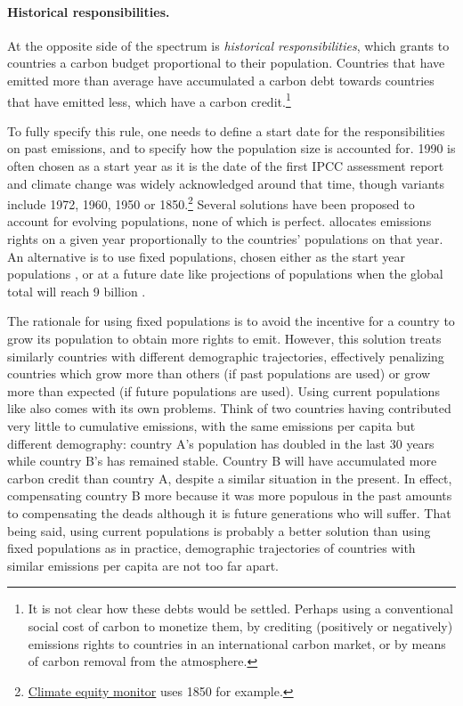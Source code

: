 \paragraph{Historical responsibilities.} At the opposite side of the spectrum is \textit{historical responsibilities}, which grants to countries a carbon budget proportional to their population. Countries that have emitted more than average have accumulated a carbon debt towards countries that have emitted less, which have a carbon credit.\footnote{It is not clear how these debts would be settled. Perhaps using a conventional social cost of carbon to monetize them, by crediting (positively or negatively) emissions rights to countries in an international carbon market, or by means of carbon removal from the atmosphere.} 

To fully specify this rule, one needs to define a start date for the responsibilities on past emissions, and to specify how the population size is accounted for. 1990 is often chosen as a start year as it is the date of the first IPCC assessment report and climate change was widely acknowledged around that time, though variants include 1972, 1960, 1950 or 1850.\footnote{\href{https://climateequitymonitor.in}{Climate equity monitor} uses 1850 for example.} Several solutions have been proposed to account for evolving populations, none of which is perfect. \citet{matthews_quantifying_2015} allocates emissions rights on a given year proportionally to the countries' populations on that year. An alternative is to use fixed populations, chosen either as the start year populations \citep{neumayer_defence_2000}, or at a future date like projections of populations when the global total will reach 9 billion \citep{raupach_sharing_2014}. 

The rationale for using fixed populations is to avoid the incentive for a country to grow its population to obtain more rights to emit. However, this solution treats similarly countries with different demographic trajectories, effectively penalizing countries which grow more than others (if past populations are used) or grow more than expected (if future populations are used). Using current populations like \citet{matthews_quantifying_2015} also comes with its own problems. Think of two countries having contributed very little to cumulative emissions, with the same emissions per capita but different demography: country A's population has doubled in the last 30 years while country B's has remained stable. Country B will have accumulated more carbon credit than country A, despite a similar situation in the present. In effect, compensating country B more because it was more populous in the past amounts to compensating the deads although it is future generations who will suffer. That being said, using current populations is probably a better solution than using fixed populations as in practice, demographic trajectories of countries with similar emissions per capita are not too far apart. 

